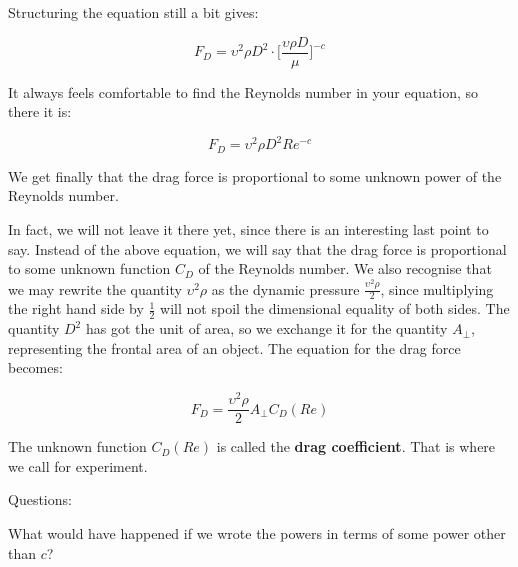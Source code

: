 Structuring the equation still a bit gives:

\begin{equation}
F_D = \upsilon^2 \rho D^2 \cdot \Big[ \frac{\upsilon \rho D}{\mu} \Big]^{-c}
\label{eq:drag_force_powers}
\end{equation}

It always feels comfortable to find the Reynolds number in your equation, so there it is:

\begin{equation}
F_D = \upsilon^2 \rho D^2 Re^{-c}
\label{eq:drag_force_powers}
\end{equation}

We get finally that the drag force is proportional to some unknown power of the Reynolds number.


In fact, we will not leave it there yet, since there is an interesting last point to say. Instead of the above equation, we will say that the drag force is proportional to some unknown function $C_D$ of the Reynolds number. We also recognise that we may rewrite the quantity $\upsilon^2 \rho$ as the dynamic pressure $\frac{\upsilon^2 \rho}{2}$, since multiplying the right hand side by $\frac{1}{2}$ will not spoil the dimensional equality of both sides. The quantity $D^2$ has got the unit of area, so we exchange it for the quantity $A_{\perp}$, representing the frontal area of an object. The equation for the drag force becomes:

\begin{equation}
F_D = \frac{\upsilon^2 \rho}{2} A_{\perp} C_D (Re)
\label{eq:drag_force_powers}
\end{equation}

The unknown function $C_D (Re)$ is called the \textbf{drag coefficient}. That is where we call for experiment.

Questions:

What would have happened if we wrote the powers in terms of some power other than $c$?








